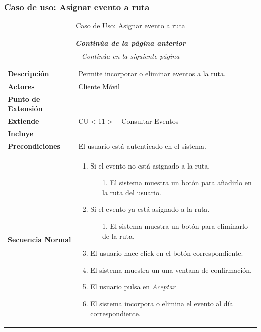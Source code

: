 \newpage
\subsubsection*{Caso de uso: Asignar evento a ruta }
\begin{longtable}{| p{4cm} | p{10cm} |}
\endfirsthead
\multicolumn{2}{c}{\textit{Continúa de la página anterior}}\\[12pt]
\hline
\endhead
\hline
\multicolumn{2}{c}{\textit{Continúa en la siguiente página}} \\
\endfoot
\hline
\caption{Caso de Uso: Asignar evento a ruta}\label{fig:1}\\
\endlastfoot


\hline
\multicolumn{2}{|c|}{\textbf{CU$<$13$>$ - Asignar Evento a ruta}} \\

\hline
\textbf{Descripción} &
Permite incorporar o eliminar eventos a la ruta.\\

\hline
\textbf{Actores} &
Cliente Móvil\\

\hline
\textbf{Punto de Extensión} &
\\

\hline
\textbf{Extiende} &
CU$<$11$>$ - Consultar Eventos
\\

\hline
\textbf{Incluye} &
\\

\hline
\textbf{Precondiciones} &
El usuario está autenticado en el sistema.\\

\hline
\textbf{Secuencia Normal} &\mbox{}\par\vspace{-\baselineskip}
\begin{enumerate}[leftmargin=0.7cm, topsep=0.1cm]
\item Si el evento no está asignado a la ruta.
	\begin{itemize}
	\item[1.] El sistema muestra un botón para añadirlo en la ruta del usuario.
	\end{itemize}
\item Si el evento ya está asignado a la ruta.
	\begin{itemize}
	\item[1.] El sistema muestra un botón para eliminarlo de la ruta.
	\end{itemize}
\item El usuario hace click en el botón correspondiente.
\item El sistema muestra un una ventana de confirmación.
\item El usuario pulsa en \textit{Aceptar}
\item El sistema incorpora o elimina el evento al día correspondiente.
\end{enumerate}



\end{longtable}
